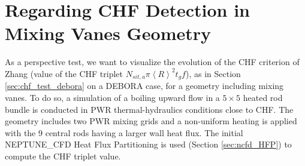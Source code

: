 %
%
%
%
%


\section{Regarding CHF Detection in Mixing Vanes Geometry}

As a perspective test, we want to visualize the evolution of the CHF criterion of Zhang \cite{zhang_new_2022} (value of the CHF triplet $N_{sit,a} \pi \left<R\right>^{2} t_{g}f$), as in Section \ref{sec:chf_test_debora} on a DEBORA case, for a geometry including mixing vanes. To do so, a simulation of a boiling upward flow in a $5 \times 5$ heated rod bundle is conducted in PWR thermal-hydraulics conditions close to CHF. The geometry includes two PWR mixing grids and a non-uniform heating is applied with the 9 central rods having a larger wall heat flux. The initial NEPTUNE\_CFD Heat Flux Partitioning is used (Section \ref{sec:ncfd_HFP}) to compute the CHF triplet value.

